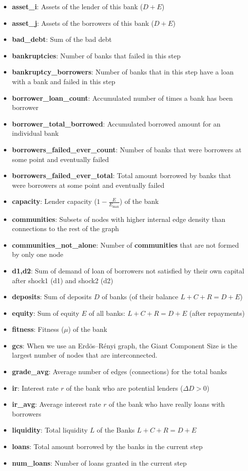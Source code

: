 \documentclass{article}
\begin{document}
\begin{itemize}
    \item \textbf{asset\_i}: Assets of the lender of this bank ($D + E$)
    \item \textbf{asset\_j}: Assets of the borrowers of this bank ($D + E$)
    \item \textbf{bad\_debt}: Sum of the bad debt
    \item \textbf{bankruptcies}: Number of banks that failed in this step
    \item \textbf{bankruptcy\_borrowers}: Number of banks that in this step have a loan with a bank and failed in this step
    \item \textbf{borrower\_loan\_count}: Accumulated number of times a bank has been borrower
    \item \textbf{borrower\_total\_borrowed}: Accumulated borrowed amount for an individual bank
    \item \textbf{borrowers\_failed\_ever\_count}: Number of banks that were borrowers at some point and eventually failed
    \item \textbf{borrowers\_failed\_ever\_total}: Total amount borrowed by banks that were borrowers at some point and eventually failed
    \item \textbf{capacity}: Lender capacity ($1 - \frac{E}{E_{\max}}$) of the bank
    \item \textbf{communities}: Subsets of nodes with higher internal edge density than connections to the rest of the graph
    \item \textbf{communities\_not\_alone}:  Number of \textbf{communities} that are not formed by only one node
    \item \textbf{d1,d2}: Sum of demand of loan of borrowers not satisfied by their own capital after shock1 (d1) and shock2 (d2)
    \item \textbf{deposits}: Sum of deposits $D$ of banks (of their balance $L + C + R = D + E$)
    \item \textbf{equity}: Sum of equity $E$ of all banks: $L + C + R = D + E$ (after repayments)
    \item \textbf{fitness}: Fitness ($\mu$) of the bank
    \item \textbf{gcs}: When we use an Erdös–Rényi graph, the Giant Component Size is the largest number of nodes that are interconnected.
    \item \textbf{grade\_avg}: Average number of edges (connections) for the total banks
    \item \textbf{ir}: Interest rate $r$ of the bank who are potential lenders ($\Delta D>0$)
    \item \textbf{ir\_avg}: Average interest rate $r$ of the bank who have really loans with borrowers
    \item \textbf{liquidity}: Total liquidity $L$ of the Banks  $L + C + R = D + E$
    \item \textbf{loans}: Total amount borrowed by the banks in the current step
    \item \textbf{num\_loans}:  Number of loans granted in the current step
    

\end{itemize}
\end{document}
